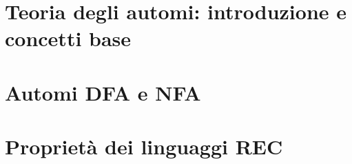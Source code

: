 \documentclass[12pt]{article}
\begin{document}
%

\tableofcontents
\restoregeometry

\section{Teoria degli automi: introduzione e concetti base}


\section{Automi DFA e NFA}


\section{Proprietà dei linguaggi REC}


%

%
\end{document}

